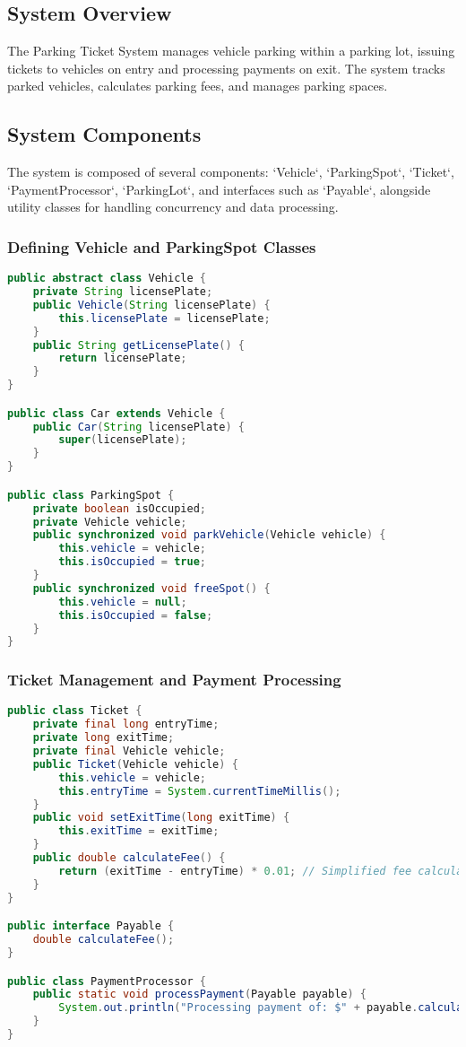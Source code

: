 \documentclass{article}
\begin{document}
\subsection{System Overview}
The Parking Ticket System manages vehicle parking within a parking lot, issuing tickets to vehicles on entry and processing payments on exit. The system tracks parked vehicles, calculates parking fees, and manages parking spaces.

\subsection{System Components}
The system is composed of several components: `Vehicle`, `ParkingSpot`, `Ticket`, `PaymentProcessor`, `ParkingLot`, and interfaces such as `Payable`, alongside utility classes for handling concurrency and data processing.

\subsubsection{Defining Vehicle and ParkingSpot Classes}
\begin{lstlisting}[language=Java]
public abstract class Vehicle {
    private String licensePlate;
    public Vehicle(String licensePlate) {
        this.licensePlate = licensePlate;
    }
    public String getLicensePlate() {
        return licensePlate;
    }
}

public class Car extends Vehicle {
    public Car(String licensePlate) {
        super(licensePlate);
    }
}

public class ParkingSpot {
    private boolean isOccupied;
    private Vehicle vehicle;
    public synchronized void parkVehicle(Vehicle vehicle) {
        this.vehicle = vehicle;
        this.isOccupied = true;
    }
    public synchronized void freeSpot() {
        this.vehicle = null;
        this.isOccupied = false;
    }
}
\end{lstlisting}

\subsubsection{Ticket Management and Payment Processing}
\begin{lstlisting}[language=Java]
public class Ticket {
    private final long entryTime;
    private long exitTime;
    private final Vehicle vehicle;
    public Ticket(Vehicle vehicle) {
        this.vehicle = vehicle;
        this.entryTime = System.currentTimeMillis();
    }
    public void setExitTime(long exitTime) {
        this.exitTime = exitTime;
    }
    public double calculateFee() {
        return (exitTime - entryTime) * 0.01; // Simplified fee calculation
    }
}

public interface Payable {
    double calculateFee();
}

public class PaymentProcessor {
    public static void processPayment(Payable payable) {
        System.out.println("Processing payment of: $" + payable.calculateFee());
    }
}
\end{lstlisting}
\end{document}
